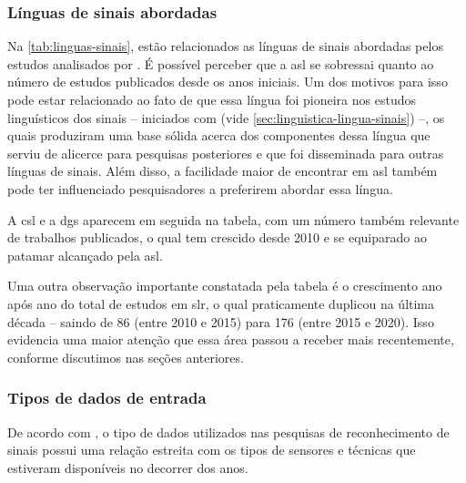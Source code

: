 \subsubsection{Línguas de sinais abordadas}
\label{sec:slr-linguas-sinais}

Na \autoref{tab:linguas-sinais}, estão relacionados as línguas de sinais abordadas pelos estudos analisados por . É possível perceber que a \acrfull{asl} se sobressai quanto ao número de estudos publicados desde os anos iniciais. Um dos motivos para isso pode estar relacionado ao fato de que essa língua foi pioneira nos estudos linguísticos dos sinais -- iniciados com  (vide \autoref{sec:linguistica-lingua-sinais}) --, os quais produziram uma base sólida acerca dos componentes dessa língua que serviu de alicerce para pesquisas posteriores e que foi disseminada para outras línguas de sinais. Além disso, a facilidade maior de encontrar \datasets em \acrshort{asl} também pode ter influenciado pesquisadores a preferirem abordar essa língua.

A \acrfull{csl} e a \acrfull{dgs} aparecem em seguida na tabela, com um número também relevante de trabalhos publicados, o qual tem crescido desde 2010 e se equiparado ao patamar alcançado pela \acrshort{asl}.



Uma outra observação importante constatada pela tabela é o crescimento ano após ano do total de estudos em \acrshort{slr}, o qual praticamente duplicou na última década -- saindo de 86 (entre 2010 e 2015) para 176 (entre 2015 e 2020). Isso evidencia uma maior atenção que essa área passou a receber mais recentemente, conforme discutimos nas seções anteriores.



\subsubsection{Tipos de dados de entrada}
\label{sec:slr-tipos-dados-entrada}

De acordo com , o tipo de dados utilizados nas pesquisas de reconhecimento de sinais possui uma relação estreita com os tipos de sensores e técnicas que estiveram disponíveis no decorrer dos anos. 

